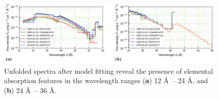     \begin{figure}[!htb]
        \centering
        \includegraphics[width=\textwidth]{figures/eufspec/mr-vel-uf_all-obs}
        \caption{Unfolded spectra after model fitting reveal the presence of elemental absorption features in the wavelength ranges (\textbf{a}) 12 \AA\ -- 24 \AA, and (\textbf{b}) 24 \AA\ -- 36 \AA.}
        \label{fig:all-uf}
    \end{figure}
    
    
